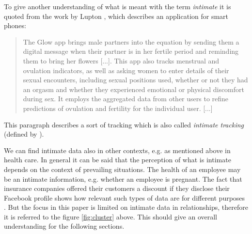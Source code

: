 To give another understanding of what is meant with the term \textit{intimate} it is quoted from the work by Lupton \cite{doi:10.1080/13691058.2014.920528}, which describes an application for smart phones:
\begin{quote}
	The	Glow app brings male partners into the equation by sending them a digital
	message when their partner is in her fertile period and reminding them to bring her flowers	[...]. This app also tracks menstrual and ovulation indicators, as well as asking women to enter details of their sexual encounters, including sexual positions used, whether or not they had an orgasm and whether they experienced emotional or physical discomfort during sex. It employs the aggregated data from other users to refine predictions of ovulation and fertility for the individual user. [...]
\end{quote}
This paragraph describes a sort of tracking which is also called \textit{intimate tracking} (defined by \cite{doi:10.1080/15265161.2017.1409823}).

We can find intimate data also in other contexts, e.g. as mentioned above in health care.
In general it can be said that the perception of what is intimate depends on the context of prevailing situations. The health of an employee may be an intimate information, e.g. whether an employee is pregnant. The fact that insurance companies offered their customers a discount if they disclose their Facebook profile shows how relevant such types of data are for different purposes \cite{versicherungKfz}.
But the focus in this paper is limited on intimate data in relationships, therefore it is referred to the figure \ref{fig:cluster} above. This should give an overall understanding for the following sections. 
